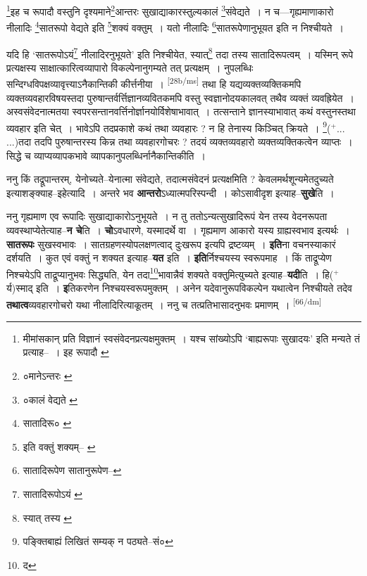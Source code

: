 \documentclass[article,12pt,a4paper]{memoir}
\newcommand{\add}[1]{($^{+}$#1)}
\begin{document}
	\footnote{मीमांसकान् प्रति विज्ञानं स्वसंवेदनप्रत्यक्षमुक्तम् । यश्च सांख्योऽपि ‘बाह्यरूपाः सुखादयः’ इति मन्यते तं प्रत्याह--\cite{dp-msD-n} । इह रूपादौ \cite{dp-msD}}इह च रूपादौ वस्तुनि दृश्यमाने\footnote{०मानेऽन्तरः \cite{dp-msA} \cite{dp-msB} \cite{dp-msC} \cite{dp-msD} \cite{dp-edP} \cite{dp-edH} \cite{dp-edE}}आन्तरः सुखाद्याकारस्तुल्यकालं \footnote{०कालं वेद्यते \cite{dp-msC}}संवेद्यते । न च—गृह्यमाणाकारो नीलादिः \footnote{सातादिरू० \cite{dp-edP} \cite{dp-edH} \cite{dp-edE} \cite{dp-edN}}सातरूपो वेद्यते इति \footnote{इति वक्तुं शक्यम्--\cite{dp-msA} \cite{dp-edP} \cite{dp-edH} \cite{dp-edE}}शक्यं वक्तुम् । यतो नीलादिः \footnote{सातादिरूपेण \cite{dp-msA} \cite{dp-msC} \cite{dp-msD} \cite{dp-edP} \cite{dp-edH} \cite{dp-edE} \cite{dp-edN} सातानुरूपेण--\cite{dp-msB}}सातरूपेणानुभूयत इति न निश्चीयते । 
	  
	यदि हि ‘सातरूपोऽयं\footnote{सातादिरूपोऽयं \cite{dp-msA} \cite{dp-msC} \cite{dp-edP} \cite{dp-edE} \cite{dp-edN}} नीलादिरनुभूयते’ इति निश्चीयेत, स्यात्\footnote{स्यात् तस्य \cite{dp-msA} \cite{dp-msC} \cite{dp-edP} \cite{dp-edE}} तदा तस्य सातादिरूपत्वम् । यस्मिन् रूपे प्रत्यक्षस्य साक्षात्कारित्वव्यापारो विकल्पेनानुगम्यते तत् प्रत्यक्षम् । नुपलब्धिः सन्दिग्धविपक्षव्यावृत्त्याऽनैकान्तिकी कीर्त्तनीया । \leavevmode\textsuperscript{\rmlatinfont\tiny [28b/ms]} तथा हि यद्यव्यक्तव्यक्तिकमपि व्यक्तव्यवहारविषयस्तदा पुरुषान्तर्वर्त्तिज्ञानव्यवितकमपि वस्तु स्वज्ञानोदयकालवत् तथैव व्यक्तं व्यवह्रियेत । अस्वसंवेदनात्मतया स्वपरसन्तानवर्त्तिनोर्ज्ञानयोर्विशेषाभावात् । तत्सन्ताने ज्ञानस्याभावात् कथं वस्तुनस्तथा व्यवहार इति चेत् । भावेऽपि तदप्रकाशे कथं तथा व्यवहारः ? न हि तेनास्य किञ्चित् क्रियते । \footnote{पङ्क्तिबाह्यं लिखितं सम्यक् न पठ्यते--सं०}\add{... ...}तदा तदपि पुरुषान्तरस्य किन्न तथा व्यवहारगोचरः ? तदयं व्यक्तव्यवहारो व्यक्तव्यक्तिकत्वेन व्याप्तः । सिद्धे च व्याप्यव्यापकभावे व्यापकानुपलब्धिर्नानैकान्तिकीति ।
	\pend
      

	  \pstart ननु किं तद्रूपान्तरम्, येनोच्यते--येनात्मा संवेद्यते, तदात्मसंवेदनं प्रत्यक्षमिति ? केवलमर्थशून्यमेतदुच्यते इत्याशङ्क्याह--इहेत्यादि । अन्तरे भव \textbf{आन्तरो}ऽध्यात्मपरिस्पन्दी । कोऽसावीदृश इत्याह--\textbf{सुखे}ति ।
	\pend
      

	  \pstart ननु गृह्यमाण एव रूपादिः सुखाद्याकारोऽनुभूयते । न तु ततोऽन्यत्सुखादिरूपं येन तस्य वेदनरूपता व्यवस्थाप्येतेत्याह--\textbf{न चे}ति । \textbf{चो}ऽवधारणे, यस्मादर्थे वा । गृह्यमाण आकारो यस्य ग्राह्यस्वभाव इत्यर्थः । \textbf{सातरूपः} सुखस्वभावः । सातग्रहणस्योपलक्षणत्वाद् दुःखरूप इत्यपि द्रष्टव्यम् । \textbf{इति}ना वचनस्याकारं दर्शयति । कुत एवं वक्तुं न शक्यत इत्याह--\textbf{यत} इति । \textbf{इति}र्निश्चयस्य स्वरूपमाह । किं ताद्रूप्येण निश्चयेऽपि ताद्रूप्यानुभवः सिद्ध्यति, येन तदा\footnote{द}भावान्नैवं शक्यते वक्तुमित्युच्यते इत्याह--\textbf{यदी}ति । हि\add{र्य}स्माद् इति । \textbf{इ}तिकरणेन निश्चयस्वरूपमुक्तम् । अनेन यदेवानुरूपविकल्पेन यथात्वेन निश्चीयते तदेव \textbf{तथात्व}व्यवहारगोचरो यथा नीलादिरित्याकूतम् । ननु च तत्प्रतिभासादनुभवः प्रमाणम् ।  \leavevmode\textsuperscript{\rmlatinfont\tiny [66/dm]} 
	  
\end{document}
